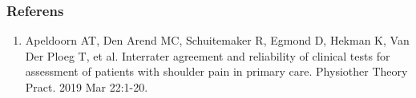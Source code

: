 \documentclass[10pt,a4paper]{article}
\begin{document}
\subsubsection*{Referens}
\begin{enumerate}
\item Apeldoorn AT, Den Arend MC, Schuitemaker R, Egmond D, Hekman K, Van Der Ploeg T, et al. Interrater agreement and reliability of clinical tests for assessment of patients with shoulder pain in primary care. Physiother Theory Pract. 2019 Mar 22:1-20.
\end{enumerate}
\end{document}
